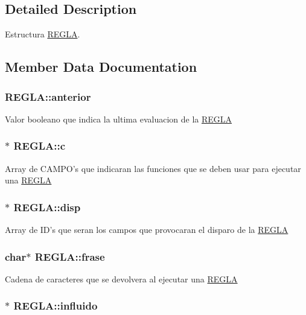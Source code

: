 \subsection{Detailed Description}
Estructura \hyperlink{structREGLA}{REGLA}. 

\subsection{Member Data Documentation}
\hypertarget{structREGLA_ac7c717fa3194096120eecdad83a7a789}{
\subsubsection[{anterior}]{ {\bf REGLA::anterior}}}
\label{structREGLA_ac7c717fa3194096120eecdad83a7a789}
Valor booleano que indica la ultima evaluacion de la \hyperlink{structREGLA}{REGLA} \hypertarget{structREGLA_a79f8e5ff3abf4f287eb43a7fe9690613}{
\subsubsection[{c}]{$\ast$ {\bf REGLA::c}}}
\label{structREGLA_a79f8e5ff3abf4f287eb43a7fe9690613}
Array de CAMPO's que indicaran las funciones que se deben usar para ejecutar una \hyperlink{structREGLA}{REGLA} \hypertarget{structREGLA_ae4997a4fd9c0b9e649cbe73b6c9283c8}{
\subsubsection[{disp}]{$\ast$ {\bf REGLA::disp}}}
\label{structREGLA_ae4997a4fd9c0b9e649cbe73b6c9283c8}
Array de ID's que seran los campos que provocaran el disparo de la \hyperlink{structREGLA}{REGLA} \hypertarget{structREGLA_a5a95ee6d2693626c07c680052a689682}{
\subsubsection[{frase}]{\setlength{\rightskip}{0pt plus 5cm}char$\ast$ {\bf REGLA::frase}}}
\label{structREGLA_a5a95ee6d2693626c07c680052a689682}
Cadena de caracteres que se devolvera al ejecutar una \hyperlink{structREGLA}{REGLA} \hypertarget{structREGLA_aba3a533e68fa21a4d3fef8122b945699}{
\subsubsection[{influido}]{$\ast$ {\bf REGLA::influido}}}
